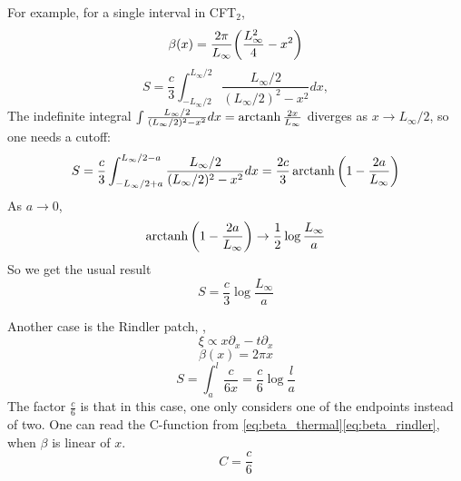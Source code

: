 \documentclass[11pt,a4paper]{article}
\begin{document}
	For example, for a single interval in CFT$_2$,
	\begin{equation}
	\beta(x)=\frac{2\pi}{L_\infty}
		\pqty{\frac{L_\infty^2}{4}-x^2}
	\end{equation}
	\begin{equation}
	S= \frac{c}{3} \int_{-L_\infty/2}^{L_\infty/2}
			\frac{L_\infty/2}{(L_\infty/2)^2-x^2}dx,
	\end{equation}
	The indefinite integral $
		\int \frac{L_\infty/2}{(L_\infty/2)^2-x^2}dx
		= \operatorname{arctanh}\frac{2x}{L_\infty}
	$ diverges as $x\rightarrow L_\infty/2$, so one needs a cutoff:
	\begin{equation}
	S=\frac{c}{3}\int_{-L_\infty/2+a}^{L_\infty/2-a}
		\frac{L_\infty/2}{(L_\infty/2)^2-x^2}dx
	=\frac{2c}{3} \mop{arctanh} \pqty{
			1-\frac{2a}{L_\infty}
		}
	\end{equation}
	As $a\rightarrow 0$,
	\begin{equation}
		\mop{arctanh} \pqty{
			1-\frac{2a}{L_\infty}
		}\rightarrow \frac{1}{2}\log\frac{L_\infty}{a}
	\end{equation}
	So we get the usual result
	\begin{equation}
	S=\frac{c}{3}\log\frac{L_\infty}{a}
	\end{equation}
	
	Another case is the Rindler patch, ,
	\begin{equation}
	\xi\propto x\partial_x-t\partial_x
	\end{equation}
	\begin{equation}
	\beta(x)=2\pi x
	\label{eq:beta_rindler}
	\end{equation}
	\begin{equation}
	S=\int_{a}^{l}\frac{c}{6x}=\frac{c}{6}\log \frac{l}{a}
	\end{equation}
	The factor $\frac{c}{6}$ is that in this case, one only considers one of the endpoints instead of two. One can read the C-function from \eqref{eq:beta_thermal}\eqref{eq:beta_rindler}, when $\beta$ is linear of $x$.
	\begin{equation}
	C=\frac{c}{6}
	\end{equation}
	
	
\end{document}
